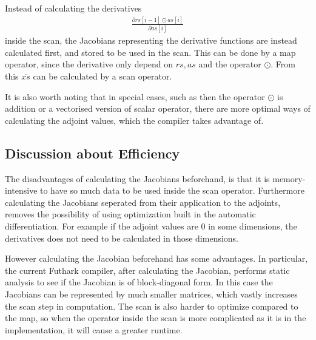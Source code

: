 \documentclass{article}
\newcommand{\rs}{rs}
\newcommand{\xo}{\overline{xs}}
\newcommand{\as}{as}
\begin{document}
Instead of calculating the derivatives
\begin{align*}
	\frac{\partial rs[i-1] \odot \as[i]}{\partial \as[i]}
\end{align*}
inside the scan,
the Jacobians representing the derivative functions are instead calculated
first, and stored to be used in the scan.
This can be done by a map operator,
since the derivative only depend on \(\rs, \as\) and the operator \(\odot\).
From this \(\xo\) can be calculated by a scan operator.

It is also worth noting that in special cases,
such as then the operator \(\odot\) is addition or a vectorised version of scalar operator,
there are more optimal ways of calculating the adjoint values,
which the compiler takes advantage of.
\subsection{Discussion about Efficiency}
The disadvantages of calculating the Jacobians beforehand,
is that it is memory-intensive to have so much data to be used inside the
scan operator. Furthermore calculating the Jacobians seperated from their
application to the adjoints,
removes the possibility of using optimization built in the automatic
differentiation.
For example if the adjoint values are 0 in some dimensions,
the derivatives does not need to be calculated in those dimensions.

However calculating the Jacobian beforehand has some advantages. In
particular,
the current Futhark compiler, after calculating the Jacobian, performs static
analysis to see if the Jacobian is of block-diagonal form.
In this case the Jacobians can be represented by much smaller matrices,
which vastly increases the scan step in computation.
The scan is also harder to optimize compared to the map,
so when the operator inside the scan is more complicated as it is in the
\cite{PPAD} implementation,
it will cause a greater runtime.
\newpage
\end{document}
